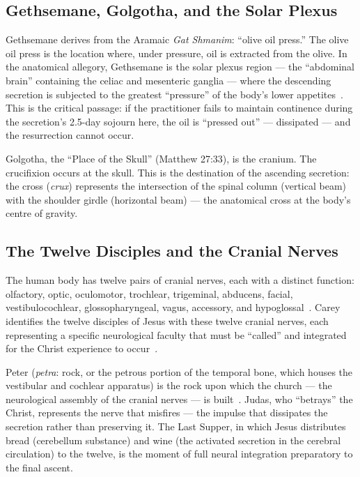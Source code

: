 \documentclass[12pt, a4paper]{article}
\begin{document}
\subsection{Gethsemane, Golgotha, and the Solar Plexus}

Gethsemane derives from the Aramaic \emph{Gat Shmanim}: ``olive oil press.''
The olive oil press is the location where, under pressure, oil is extracted
from the olive. In the anatomical allegory, Gethsemane is the solar plexus
region — the ``abdominal brain'' containing the celiac and mesenteric ganglia
— where the descending secretion is subjected to the greatest ``pressure'' of
the body's lower appetites~\autocite[83]{carey1920}. This is the critical
passage: if the practitioner fails to maintain continence during the
secretion's 2.5-day sojourn here, the oil is ``pressed out'' — dissipated —
and the resurrection cannot occur.

Golgotha, the ``Place of the Skull'' (Matthew 27:33), is the cranium. The
crucifixion occurs at the skull. This is the destination of the ascending
secretion: the cross (\emph{crux}) represents the intersection of the spinal
column (vertical beam) with the shoulder girdle (horizontal beam) — the
anatomical cross at the body's centre of gravity.

\subsection{The Twelve Disciples and the Cranial Nerves}

The human body has twelve pairs of cranial nerves, each with a distinct
function: olfactory, optic, oculomotor, trochlear, trigeminal, abducens,
facial, vestibulocochlear, glossopharyngeal, vagus, accessory, and
hypoglossal~\autocite[878]{gray2016}. Carey identifies the twelve disciples of
Jesus with these twelve cranial nerves, each representing a specific
neurological faculty that must be ``called'' and integrated for the Christ
experience to occur~\autocite[91]{carey1920}.

Peter (\emph{petra}: rock, or the petrous portion of the temporal bone, which
houses the vestibular and cochlear apparatus) is the rock upon which the
church — the neurological assembly of the cranial nerves — is
built~\autocite[94]{carey1920}. Judas, who ``betrays'' the Christ, represents
the nerve that misfires — the impulse that dissipates the secretion rather
than preserving it. The Last Supper, in which Jesus distributes bread
(cerebellum substance) and wine (the activated secretion in the cerebral
circulation) to the twelve, is the moment of full neural integration
preparatory to the final ascent.
\end{document}
